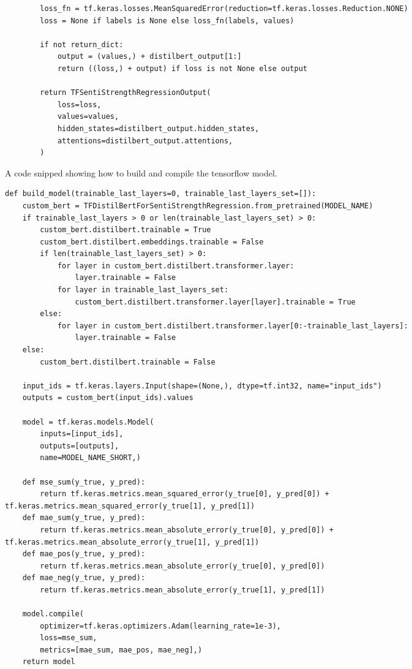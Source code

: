 \begin{listing*}
\begin{verbatim}
        loss_fn = tf.keras.losses.MeanSquaredError(reduction=tf.keras.losses.Reduction.NONE)
        loss = None if labels is None else loss_fn(labels, values)

        if not return_dict:
            output = (values,) + distilbert_output[1:]
            return ((loss,) + output) if loss is not None else output

        return TFSentiStrengthRegressionOutput(
            loss=loss,
            values=values,
            hidden_states=distilbert_output.hidden_states,
            attentions=distilbert_output.attentions,
        )
\end{verbatim}
\label{listing:p2t-regression-model}
\end{listing*}

\begin{listing*}
\caption{A code snipped showing how to build and compile the tensorflow model.}
\begin{verbatim}
def build_model(trainable_last_layers=0, trainable_last_layers_set=[]):
    custom_bert = TFDistilBertForSentiStrengthRegression.from_pretrained(MODEL_NAME)
    if trainable_last_layers > 0 or len(trainable_last_layers_set) > 0:
        custom_bert.distilbert.trainable = True
        custom_bert.distilbert.embeddings.trainable = False
        if len(trainable_last_layers_set) > 0:
            for layer in custom_bert.distilbert.transformer.layer:
                layer.trainable = False
            for layer in trainable_last_layers_set:
                custom_bert.distilbert.transformer.layer[layer].trainable = True
        else:
            for layer in custom_bert.distilbert.transformer.layer[0:-trainable_last_layers]:
                layer.trainable = False
    else:
        custom_bert.distilbert.trainable = False

    input_ids = tf.keras.layers.Input(shape=(None,), dtype=tf.int32, name="input_ids")
    outputs = custom_bert(input_ids).values

    model = tf.keras.models.Model(
        inputs=[input_ids],
        outputs=[outputs],
        name=MODEL_NAME_SHORT,)

    def mse_sum(y_true, y_pred):
        return tf.keras.metrics.mean_squared_error(y_true[0], y_pred[0]) + tf.keras.metrics.mean_squared_error(y_true[1], y_pred[1])
    def mae_sum(y_true, y_pred):
        return tf.keras.metrics.mean_absolute_error(y_true[0], y_pred[0]) + tf.keras.metrics.mean_absolute_error(y_true[1], y_pred[1])
    def mae_pos(y_true, y_pred):
        return tf.keras.metrics.mean_absolute_error(y_true[0], y_pred[0])
    def mae_neg(y_true, y_pred):
        return tf.keras.metrics.mean_absolute_error(y_true[1], y_pred[1])

    model.compile(
        optimizer=tf.keras.optimizers.Adam(learning_rate=1e-3),
        loss=mse_sum,
        metrics=[mae_sum, mae_pos, mae_neg],)
    return model
\end{verbatim}
\label{listing:p2t-build-model}
\end{listing*}

